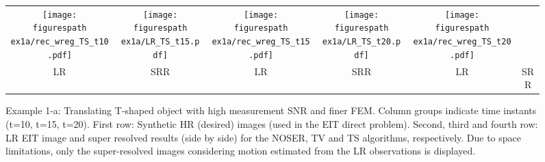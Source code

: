 \documentclass[10pt]{IEEEtran}
\newcommand{\figurespath}{figs/}
\begin{document}
\begin{figure*}[!htb]
\begin{center}
\begin{tabular}{cc||cc||cc}
  \texttt{[image: \\figurespath ex1a/rec\_wreg\_TS\_t10.pdf]}
  &
  \texttt{[image: \\figurespath ex1a/LR\_TS\_t15.pdf]}  &
  \texttt{[image: \\figurespath ex1a/rec\_wreg\_TS\_t15.pdf]}
  &
  \texttt{[image: \\figurespath ex1a/LR\_TS\_t20.pdf]}  &
  \texttt{[image: \\figurespath ex1a/rec\_wreg\_TS\_t20.pdf]} \\
  LR   &   SRR   &   LR   &   SRR   &   LR   &   SRR
\end{tabular}
\end{center}
\caption{Example 1-a: Translating T-shaped object with high measurement SNR and finer FEM. Column groups indicate time instants (t=10, t=15, t=20). First row: Synthetic HR (desired) images (used in the EIT direct problem). Second, third and fourth row: LR EIT image and super resolved results (side by side) for the NOSER, TV and TS algorithms, respectively. Due to space limitations, only the super-resolved images considering motion estimated from the LR observations is displayed.}
\label{ex1a_results}
\end{figure*}
\end{document}
